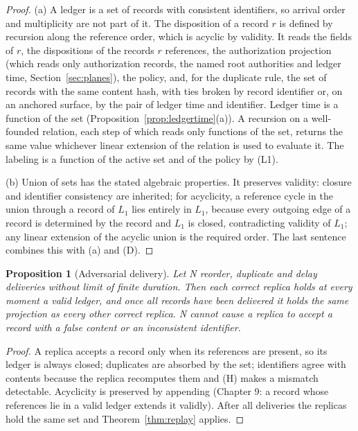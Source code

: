 \documentclass[11pt]{article}
\theoremstyle{plain}
\newtheorem{proposition}[theorem]{Proposition}
\theoremstyle{definition}
\theoremstyle{remark}
\begin{document}
\begin{proof}
(a) A ledger is a set of records with consistent identifiers, so arrival order and multiplicity are not part of it. The disposition of a record $r$ is defined by recursion along the reference order, which is acyclic by validity. It reads the fields of $r$, the dispositions of the records $r$ references, the authorization projection (which reads only authorization records, the named root authorities and ledger time, Section~\ref{sec:planes}), the policy, and, for the duplicate rule, the set of records with the same content hash, with ties broken by record identifier or, on an anchored surface, by the pair of ledger time and identifier. Ledger time is a function of the set (Proposition~\ref{prop:ledgertime}(a)). A recursion on a well-founded relation, each step of which reads only functions of the set, returns the same value whichever linear extension of the relation is used to evaluate it. The labeling is a function of the active set and of the policy by (L1).

(b) Union of sets has the stated algebraic properties. It preserves validity: closure and identifier consistency are inherited; for acyclicity, a reference cycle in the union through a record of $L_1$ lies entirely in $L_1$, because every outgoing edge of a record is determined by the record and $L_1$ is closed, contradicting validity of $L_1$; any linear extension of the acyclic union is the required order. The last sentence combines this with (a) and (D).
\end{proof}

\begin{proposition}[Adversarial delivery]\label{prop:delivery}
Let N reorder, duplicate and delay deliveries without limit of finite duration. Then each correct replica holds at every moment a valid ledger, and once all records have been delivered it holds the same projection as every other correct replica. N cannot cause a replica to accept a record with a false content or an inconsistent identifier.
\end{proposition}

\begin{proof}
A replica accepts a record only when its references are present, so its ledger is always closed; duplicates are absorbed by the set; identifiers agree with contents because the replica recomputes them and (H) makes a mismatch detectable. Acyclicity is preserved by appending (Chapter 9: a record whose references lie in a valid ledger extends it validly). After all deliveries the replicas hold the same set and Theorem~\ref{thm:replay} applies.
\end{proof}
\end{document}
